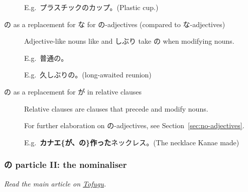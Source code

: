 \documentclass[../nihongo-gakushuu-kyouzai.tex]{subfiles}
\begin{document}
\begin{description}
    E.g.\ プラスチックのカップ。(Plastic cup.)
    \item[の as a replacement for な for の-adjectives (compared to な-adjectives)] Adjective-like nouns like  and しぶり take の when modifying nouns.

    E.g.\ 普通の。

    E.g.\ 久しぶりの。(long-awaited reunion)
    \item[の as a replacement for が in relative clauses] Relative clauses are clauses that precede and modify nouns.

    For further elaboration on の-adjectives, see Section~\ref{sec:no-adjectives}.

    E.g.\ \textbf{カナエ\{が、の\}作った}ネックレス。(The necklace Kanae made)
\end{description}



\subsubsection{の particle II: the nominaliser} \label{sec:no-the-nominaliser}
\emph{Read the main article on \href{https://www.tofugu.com/japanese-grammar/particle-no-nominalizer/}{Tofugu}.}
\end{document}
